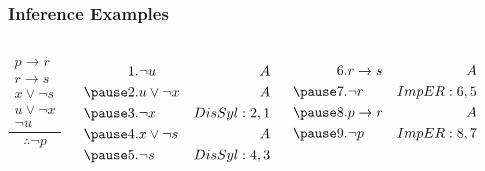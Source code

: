 \documentclass[dvipsnames]{beamer}
\begin{document}
\begin{frame}
  \frametitle{Inference Examples}

  \begin{columns}[t]
    \[
    \frac
      {
        \begin{array}{c}
          p \rightarrow r\\
          r \rightarrow s\\
          x \vee \neg s\\
          u \vee \neg x\\
          \neg u
        \end{array}
      }
      {
        \therefore \neg p
      }
    \]

    \pause
    \begin{eqnarray*}
      1. & \neg u          & A\\
      \pause
      2. & u \vee \neg x   & A\\
      \pause
      3. & \neg x          & DisSyl:2,1\\
      \pause
      4. & x \vee \neg s   & A\\
      \pause
      5. & \neg s          & DisSyl:4,3\\
    \end{eqnarray*}

    \pause
    \begin{eqnarray*}
      6. & r \rightarrow s & A\\
      \pause
      7. & \neg r          & ImpER:6,5\\
      \pause
      8. & p \rightarrow r & A\\
      \pause
      9. & \neg p          & ImpER:8,7\\
    \end{eqnarray*}
  \end{columns}
\end{frame}
\end{document}
